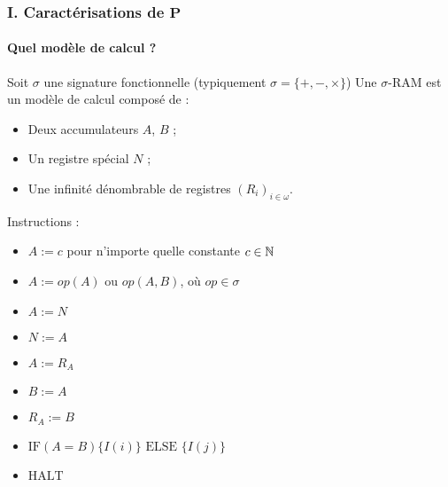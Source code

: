 \documentclass[10pt]{beamer}
\begin{document}
	
	
	\begin{frame}
		\frametitle{I. Caractérisations de $\textbf{P}$}
		\framesubtitle{Quel modèle de calcul ?}

		\begin{defn}
			Soit $\sigma$ une signature fonctionnelle (typiquement $\sigma = \{+, - , \times\}$)
			Une $\sigma$-RAM est un modèle de calcul composé de :
			
			\begin{itemize}[itemsep=-1mm]
				\item	Deux accumulateurs $A$, $B$ ;
				\item 	Un registre spécial $N$ ;
				\item 	Une infinité dénombrable de registres $\left( R_i\right)_{i \in \omega}$.
			\end{itemize}
			
			
			
			Instructions :
			
			\begin{itemize}[itemsep=-1mm]
				\item 	$A := c$ pour n'importe quelle constante $c \in \mathbb{N}$
				\item 	$A := op(A)$ ou $op(A,B)$, où $op \in \sigma$
				\item 	$A := N$ 
				\item 	$N := A$
				\item 	$A := R_A$
				\item 	$B := A$ 
				\item 	$R_A := B$
				\item 	$\text{IF} (A=B) \{I( i)\} \text{ ELSE } \{I( j )\}$
				\item 	$\text{HALT}$
			\end{itemize}	
		\end{defn}
		
	\end{frame}
	
\end{document}
